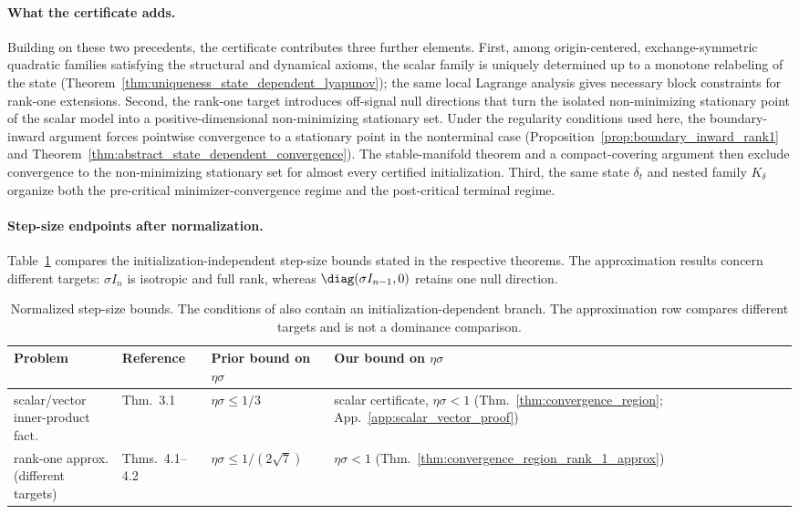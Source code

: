 \documentclass{article}
\begin{document}
\paragraph{What the certificate adds.}
Building on these two precedents, the certificate contributes three further
elements. First, among origin-centered, exchange-symmetric quadratic families
satisfying the structural and dynamical axioms, the scalar family is uniquely
determined up to a monotone relabeling of the state
(Theorem~\ref{thm:uniqueness_state_dependent_lyapunov}); the same local Lagrange
analysis gives necessary block constraints for rank-one extensions. Second, the
rank-one target introduces off-signal null directions that turn the isolated
non-minimizing stationary point of the scalar model into a positive-dimensional
non-minimizing stationary set. Under the regularity conditions used here, the
boundary-inward argument forces pointwise convergence to a stationary point in
the nonterminal case (Proposition~\ref{prop:boundary_inward_rank1} and
Theorem~\ref{thm:abstract_state_dependent_convergence}). The stable-manifold
theorem and a compact-covering argument then exclude convergence to the
non-minimizing stationary set for almost every certified initialization.
Third, the same state $\delta_t$ and nested family $K_\delta$ organize both the
pre-critical minimizer-convergence regime and the post-critical terminal regime.

\paragraph{Step-size endpoints after normalization.}
Table~\ref{tab:rw_large_step} compares the initialization-independent step-size
bounds stated in the respective theorems. The
approximation results concern different targets: $\sigma I_n$ is isotropic and
full rank, whereas $\diag(\sigma I_{n-1},0)$ retains one null direction.

\begin{table}[t]
\centering
\footnotesize
\setlength{\tabcolsep}{5pt}
\caption{Normalized step-size bounds. The conditions of
\cite{wang2022large} also contain an initialization-dependent branch. The
approximation row compares different targets and is not a dominance comparison.}
\label{tab:rw_large_step}
\begin{tabular}{@{}llll@{}}
\toprule
Problem & Reference & Prior bound on $\eta\sigma$ & Our bound on $\eta\sigma$ \\
\midrule
\shortstack[l]{scalar/vector\\inner-product fact.}
& \cite{wang2022large} Thm.~3.1
& $\eta\sigma\le 1/3$
& \shortstack[l]{scalar certificate, $\eta\sigma<1$\\
(Thm.~\ref{thm:convergence_region}; App.~\ref{app:scalar_vector_proof})} \\
\shortstack[l]{rank-one approx.\\(different targets)}
& \cite{wang2022large} Thms.~4.1--4.2
& $\eta\sigma\le 1/(2\sqrt7)$
& $\eta\sigma<1$ (Thm.~\ref{thm:convergence_region_rank_1_approx}) \\
\bottomrule
\end{tabular}
\end{table}
\end{document}
